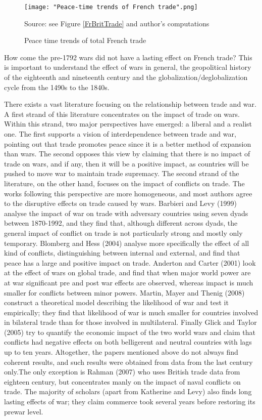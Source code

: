 \documentclass[12pt,a4paper,titlepage,english]{article}
\newcommand{\source}[1]{\caption*{\footnotesize Source: {#1}} }
\begin{document}
\begin{figure}
\caption{Peace time trends of total French trade}
\centering
\texttt{[image: "Peace-time trends of French trade".png]}

\source{see Figure \ref{FrBritTrade} and author's computations}
\label{FrPeaceTrade}
\end{figure}

How come the pre-1792 wars did not have a lasting effect on French trade? This is important to understand the effect of wars in general, the geopolitical history of the eighteenth and nineteenth century and the globalization/deglobalization cycle from the 1490s to the 1840s.

There exists a vast literature focusing on the relationship between trade and war.
A first strand of this literature concentrates on the impact of trade on wars. Within this strand, two major perspectives have emerged: a liberal and a realist one. The first supports a vision of interdependence between trade and war, pointing out that trade promotes peace since it is a better method of expansion than wars. The second opposes this view by claiming that there is no impact of trade on wars, and if any, then it will be a positive impact, as countries will be pushed to move war to maintain trade supremacy.
The second strand of the literature, on the other hand, focuses on the impact of conflicts on trade. The works following this perspective are more homogeneous, and most authors agree to the disruptive effects on trade caused by wars. Barbieri and Levy (1999) analyse the impact of war on trade with adversary countries using seven dyads between 1870-1992, and they find that, although different across dyads, the general impact of conflict on trade is not particularly strong and mostly only temporary. Blomberg and Hess (2004) analyse more specifically the effect of all kind of conflicts, distinguishing between internal and external, and find that peace has a large and positive impact on trade. Anderton and Carter (2001) look at the effect of wars on global trade, and find that when major world power are at war significant pre and post war effects are observed, whereas impact is much smaller for conflicts between minor powers. Martin, Mayer and Thenig (2008) construct a theoretical model describing the likelihood of war and test it empirically; they find that likelihood of war is much smaller for countries involved in bilateral trade than for those involved in multilateral. Finally Glick and Taylor (2005) try to quantify the economic impact of the two world wars and claim that conflicts had negative effects on both belligerent and neutral countries with lags up to ten years. Altogether, the papers mentioned above do not always find coherent results, and such results were obtained from data from the last century only.The only exception is Rahman (2007) who uses British trade data from eighteen century, but concentrates manly on the impact of naval conflicts on trade. The majority of scholars (apart from Katherine and Levy) also finds long lasting effects of war; they claim commerce took several years before restoring its prewar level.
\end{document}
